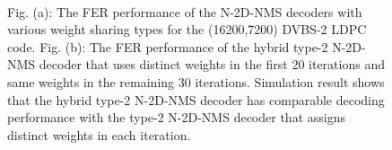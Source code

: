 \documentclass [PhD] {uclathes}
\begin{document}
\begin{figure}[hp]
    \centering
    \\
    \caption{ Fig. (a): The FER performance of
        the N-2D-NMS decoders with various weight sharing types for the (16200,7200) DVBS-2 LDPC code.
        Fig. (b): The FER performance of the hybrid type-2 N-2D-NMS decoder that uses distinct weights in the first 20 iterations and same weights in the remaining 30 iterations. Simulation result shows that the hybrid type-2 N-2D-NMS decoder has comparable decoding performance with the type-2 N-2D-NMS decoder that assigns distinct weights in each iteration.  }
\end{figure}
\end{document}
